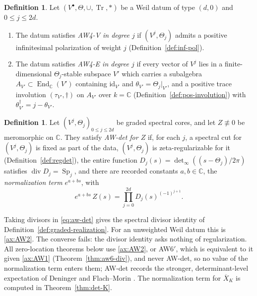 \documentclass[11pt]{amsart}
\theoremstyle{plain}
\theoremstyle{definition}
\newtheorem{definition}[theorem]{Definition}
\theoremstyle{remark}
\numberwithin{equation}{section}
\newcommand{\C}{\mathbb{C}}
\newcommand{\Xbar}{\overline{X}}
\DeclareMathOperator{\Tr}{Tr}
\DeclareMathOperator{\divisor}{div}
\newcommand{\detreg}{{\det}_{\infty}}
\begin{document}
\begin{definition}\label{def:aw4-forms}
Let $(V^\bullet,\Theta,\cup,\Tr,*)$ be a Weil datum of type $(d,0)$ and
$0\le j\le2d$.
\begin{enumerate}[label=(\alph*)]
\item The datum satisfies \emph{AW4-V in degree $j$} if
  $(V^j,\Theta_j)$ admits a positive infinitesimal polarization of
  weight $j$ (Definition~\ref{def:inf-pol}).
\item The datum satisfies \emph{AW4-E in degree $j$} if every vector of
  $V^j$ lies in a finite-dimensional $\Theta_j$-stable subspace $V'$
  which carries a subalgebra $A_{V'}\subset\operatorname{End}_\C(V')$
  containing $\mathrm{id}_{V'}$ and $\theta_{V'}=\Theta_j|_{V'}$, and a
  positive trace involution $(\tau_{V'},\dagger)$ on $A_{V'}$ over $k=\C$
  (Definition~\ref{def:pos-involution}) with
  $\theta_{V'}^\dagger=j-\theta_{V'}$.
\end{enumerate}
\end{definition}

\begin{definition}\label{def:aw-det}
Let $(V^j,\Theta_j)_{0\le j\le2d}$ be graded spectral cores, and let
$Z\not\equiv0$ be meromorphic on $\C$. They satisfy \emph{AW-det for
$Z$} if, for each $j$, a spectral cut for $(V^j,\Theta_j)$ is
fixed as part of the data, $(V^j,\Theta_j)$ is zeta-regularizable for
it (Definition~\ref{def:regdet}), the entire function
$D_j(s)=\detreg((s-\Theta_j)/2\pi)$ satisfies
$\divisor D_j=\operatorname{Sp}_j$, and there are recorded constants
$a,b\in\C$, the \emph{normalization term} $e^{a+bs}$, with
\begin{equation}\label{eq:aw-det}
e^{a+bs}\,Z(s)=\prod_{j=0}^{2d}D_j(s)^{(-1)^{j+1}}.
\tag{AW-det}
\end{equation}
\end{definition}

Taking divisors in \eqref{eq:aw-det} gives the spectral divisor
identity of Definition~\ref{def:graded-realization}. For an
unweighted Weil datum this is \ref{ax:AW2}. The converse fails:
the divisor identity asks nothing of regularization. All
zero-location theorems below use \ref{ax:AW2}, or AW6$'$, which is
equivalent to it given \ref{ax:AW1} (Theorem~\ref{thm:aw6-div}), and
never AW-det, so no value of the
normalization term enters them; AW-det records the stronger,
determinant-level expectation of Deninger
\cite[Conjecture~2, p.~3]{Deninger2010HilbertPolya} and Flach--Morin
\cite[Conjecture~2.3]{FlachMorin2020DeningerWeilArakelov}. The
normalization term for $\Xbar_K$ is computed in
Theorem~\ref{thm:det-K}.
\end{document}
